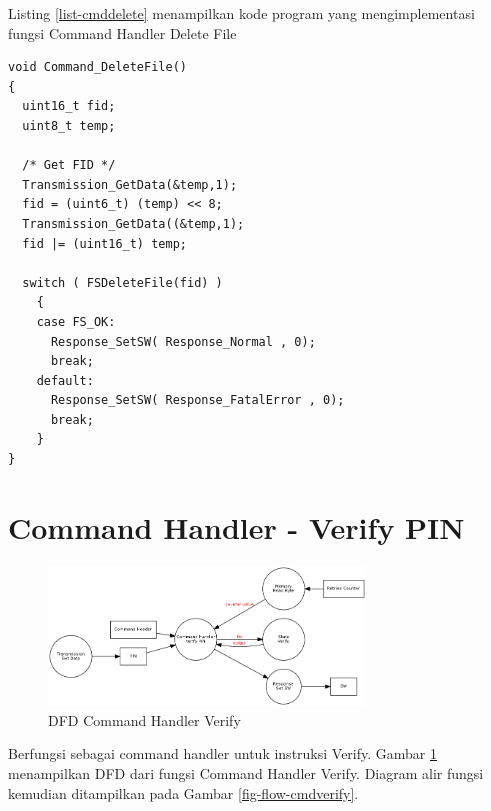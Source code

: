 Listing \ref{list-cmddelete} menampilkan kode program yang mengimplementasi fungsi Command Handler Delete File

\begin{lstlisting}[caption={Kode Program Fungsi Command Handler Delete File}, label={list-cmddelete}]
void Command_DeleteFile()
{
  uint16_t fid;
  uint8_t temp;

  /* Get FID */
  Transmission_GetData(&temp,1);
  fid = (uint6_t) (temp) << 8;
  Transmission_GetData((&temp,1);
  fid |= (uint16_t) temp;

  switch ( FSDeleteFile(fid) )
    {
    case FS_OK:
      Response_SetSW( Response_Normal , 0);
      break;
    default:
      Response_SetSW( Response_FatalError , 0);
      break;
    }
}
\end{lstlisting}


\section{Command Handler - Verify PIN}
\label{sec_cmdverify}

\begin{figure}[h]
\centering
\includegraphics[width=0.75\textwidth]{image/command/dfd_cmdverify.png}
\caption{DFD Command Handler Verify}
\label{fig-dfd-cmdverify}
\end{figure}

Berfungsi sebagai command handler untuk instruksi Verify. Gambar \ref{fig-dfd-cmdverify} menampilkan DFD dari fungsi Command Handler Verify. Diagram alir fungsi kemudian ditampilkan pada Gambar \ref{fig-flow-cmdverify}. 

